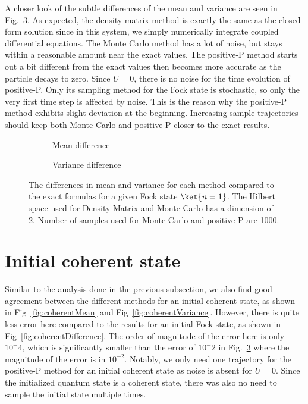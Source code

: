 \hspace{\parindent} A closer look of the subtle differences of the mean and variance are seen in Fig.~\ref{fig:fockDifference}. As expected, the density matrix method is exactly the same as the closed-form solution since in this system, we simply numerically integrate coupled differential equations. The Monte Carlo method has a lot of noise, but stays within a reasonable amount near the exact values. The positive-P method starts out a bit different from the exact values then becomes more accurate as the particle decays to zero. Since $U=0$, there is no noise for the time evolution of positive-P. Only its sampling method for the Fock state is stochastic, so only the very first time step is affected by noise. This is the reason why the positive-P method exhibits slight deviation at the beginning. Increasing sample trajectories should keep both Monte Carlo and positive-P closer to the exact results.

\begin{figure}[h]
  \centering
  \begin{subfigure}{0.48\columnwidth}
    \centering
    
    \caption{Mean difference}
    \label{fig:fockMeanDifference}
  \end{subfigure}
  \hfill
  \begin{subfigure}{0.48\columnwidth}
    \centering
    
    \caption{Variance difference}
    \label{fig:fockVarDifference}
  \end{subfigure}
  \caption{
  The differences in mean and variance for each method compared to the exact formulas for a given Fock state $\ket{n=1}$. The Hilbert space used for Density Matrix and Monte Carlo has a dimension of 2. Number of samples used for Monte Carlo and positive-P are 1000. 
  }
  \label{fig:fockDifference}
\end{figure}



\section{Initial coherent state}
\hspace{\parindent} Similar to the analysis done in the previous subsection, we also find good agreement between the different methods for an initial coherent state, as shown in Fig~\ref{fig:coherentMean} and Fig~\ref{fig:coherentVariance}. However, there is quite less error here compared to the results for an initial Fock state, as shown in Fig~\ref{fig:coherentDifference}. The order of magnitude of the error here is only $10^-4$, which is significantly smaller than the error of $10^-2$ in Fig.~\ref{fig:fockDifference} where the magnitude of the error is in $10^{-2}$. Notably, we only need one trajectory for the positive-P method for an initial coherent state as noise is absent for $U=0$. Since the initialized quantum state is a coherent state, there was also no need to sample the initial state multiple times.

